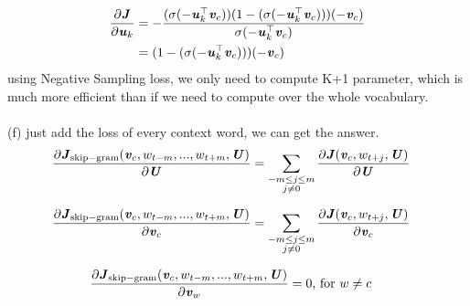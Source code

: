 \documentclass{article}
\begin{document}
\begin{equation*}
\begin{aligned}
    \frac {\partial \textbf{\textit{J}}} {\partial \textbf{\textit{u}}_k} &= - \frac{(\sigma (-\textbf{\textit{u}}_k^\top \textbf{\textit{v}}_c)) (1 - (\sigma (-\textbf{\textit{u}}_k^\top \textbf{\textit{v}}_c))) (-\textbf{\textit{v}}_c)}{\sigma (-\textbf{\textit{u}}_k^\top \textbf{\textit{v}}_c)} \\
    &= (1 - (\sigma (-\textbf{\textit{u}}_k^\top \textbf{\textit{v}}_c))) (-\textbf{\textit{v}}_c)
\end{aligned}
\end{equation*}
using Negative Sampling loss, we only need to compute K+1 parameter, which is much more efficient than if we need to compute over the whole vocabulary.
\\
\\
(f) just add the loss of every context word, we can get the answer.
\begin{equation*}
\begin{aligned}
    \frac {\partial \textbf{\textit{J}}_{\rm skip-gram} (\textbf{\textit{v}}_c , w_{t-m},...,w_{t+m},\textbf{\textit{U}})} {\partial \textbf{\textit{U}}} &= \sum_{\substack{-m \leq j \leq m \\ {j \neq 0}}}  \frac {\partial \textbf{\textit{J}} (\textbf{\textit{v}}_c , w_{t+j},\textbf{\textit{U}})} {\partial \textbf{\textit{U}}}
\end{aligned}
\end{equation*}

\begin{equation*}
\begin{aligned}
    \frac {\partial \textbf{\textit{J}}_{\rm skip-gram} (\textbf{\textit{v}}_c , w_{t-m},...,w_{t+m},\textbf{\textit{U}})} {\partial \textbf{\textit{v}}_c} &= \sum_{\substack{-m \leq j \leq m \\ {j \neq 0}}}  \frac {\partial \textbf{\textit{J}} (\textbf{\textit{v}}_c , w_{t+j},\textbf{\textit{U}})} {\partial \textbf{\textit{v}}_c}
\end{aligned}
\end{equation*}

\begin{equation*}
\begin{aligned}
    \frac {\partial \textbf{\textit{J}}_{\rm skip-gram} (\textbf{\textit{v}}_c , w_{t-m},...,w_{t+m},\textbf{\textit{U}})} {\partial \textbf{\textit{v}}_w} &= 0 \text{, for } w \neq c
\end{aligned}
\end{equation*}
\\

\end{document}
